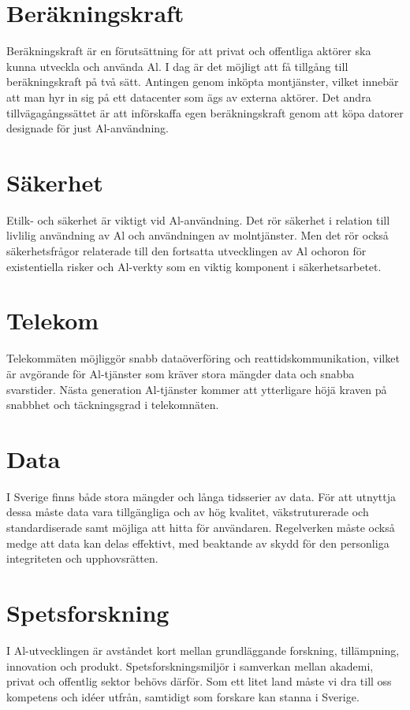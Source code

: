 {\section*{Beräkningskraft}
Beräkningskraft är en förutsättning för att privat och offentliga aktörer ska kunna utveckla och använda Al. I dag är det möjligt att få tillgång till beräkningskraft på två sätt. Antingen genom inköpta montjänster, vilket innebär att man hyr in sig på ett datacenter som ägs av externa aktörer. Det andra tillvägagångssättet är att införskaffa egen beräkningskraft genom att köpa datorer designade för just Al-användning.
\section*{Säkerhet}
Etilk- och säkerhet är viktigt vid Al-användning. Det rör säkerhet i relation till livlilig användning av Al och användningen av molntjänster. Men det rör också säkerhetsfrågor relaterade till den fortsatta utvecklingen av Al ochoron för existentiella risker och Al-verkty som en viktig komponent i säkerhetsarbetet.
\section*{Telekom}
Telekommäten möjliggör snabb dataöverföring och reattidskommunikation, vilket är avgörande för Al-tjänster som kräver stora mängder data och snabba svarstider. Nästa generation Al-tjänster kommer att ytterligare höjä kraven på snabbhet och täckningsgrad i telekomnäten.
\section*{Data}
I Sverige finns både stora mängder och långa tidsserier av data. För att utnyttja dessa måste data vara tillgängliga och av hög kvalitet, väkstruturerade och standardiserade samt möjliga att hitta för användaren. Regelverken måste också medge att data kan delas effektivt, med beaktande av skydd för den personliga integriteten och upphovsrätten.
\section*{Spetsforskning}
I Al-utvecklingen är avståndet kort mellan grundläggande forskning, tillämpning, innovation och produkt. Spetsforskningsmiljör i samverkan mellan akademi, privat och offentlig sektor behövs därför. Som ett litet land måste vi dra till oss kompetens och idéer utfrån, samtidigt som forskare kan stanna i Sverige.

}
